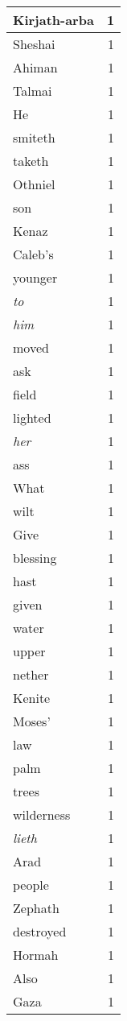 \begin{center}
\begin{longtable}{l|r}
Kirjath-arba & 1 \\ \hline
Sheshai & 1 \\ \hline
Ahiman & 1 \\ \hline
Talmai & 1 \\ \hline
He & 1 \\ \hline
smiteth & 1 \\ \hline
taketh & 1 \\ \hline
Othniel & 1 \\ \hline
son & 1 \\ \hline
Kenaz & 1 \\ \hline
Caleb's & 1 \\ \hline
younger & 1 \\ \hline
\emph{to} & 1 \\ \hline
\emph{him} & 1 \\ \hline
moved & 1 \\ \hline
ask & 1 \\ \hline
field & 1 \\ \hline
lighted & 1 \\ \hline
\emph{her} & 1 \\ \hline
ass & 1 \\ \hline
What & 1 \\ \hline
wilt & 1 \\ \hline
Give & 1 \\ \hline
blessing & 1 \\ \hline
hast & 1 \\ \hline
given & 1 \\ \hline
water & 1 \\ \hline
upper & 1 \\ \hline
nether & 1 \\ \hline
Kenite & 1 \\ \hline
Moses' & 1 \\ \hline
law & 1 \\ \hline
palm & 1 \\ \hline
trees & 1 \\ \hline
wilderness & 1 \\ \hline
\emph{lieth} & 1 \\ \hline
Arad & 1 \\ \hline
people & 1 \\ \hline
Zephath & 1 \\ \hline
destroyed & 1 \\ \hline
Hormah & 1 \\ \hline
Also & 1 \\ \hline
Gaza & 1 \\ \hline

\end{longtable}
\end{center}
